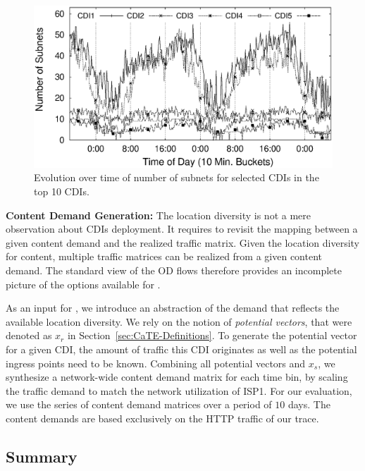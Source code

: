 \begin{figure}[tbp]
\center
\includegraphics[width=1\linewidth]{figures/SubnetChoice_r-2.eps}
\caption{Evolution over time of number of subnets for selected CDIs in the top 10 CDIs.}
\label{fig:TemporalEffect}
\vspace{-1.5em}
\end{figure}



\noindent\textbf{Content Demand Generation:}\label{sec:TM}
The location diversity is not a mere observation about CDIs deployment. It
requires to revisit the mapping between a given content demand and the realized
traffic matrix. Given the location diversity for content, multiple traffic
matrices can be realized from a given content demand. The standard view of the
OD flows therefore provides an incomplete picture of the options available for
\cate.

As an input for \cate, we introduce an abstraction of the demand that reflects
the available location diversity.  We rely on the notion of \emph{potential
  vectors}, that were denoted as $x_{r}$ in Section~\ref{sec:CaTE-Definitions}.
To generate the potential vector for a given CDI, the amount of traffic this CDI
originates as well as the potential ingress points need to be known. Combining
all potential vectors and $x_{s}$, we synthesize a network-wide content demand
matrix for each time bin, by scaling the traffic demand to match the network
utilization of ISP1.  For our evaluation, we use the series of content demand
matrices over a period of $10$ days. The content demands are based exclusively
on the HTTP traffic of our trace.


\subsection{Summary}

